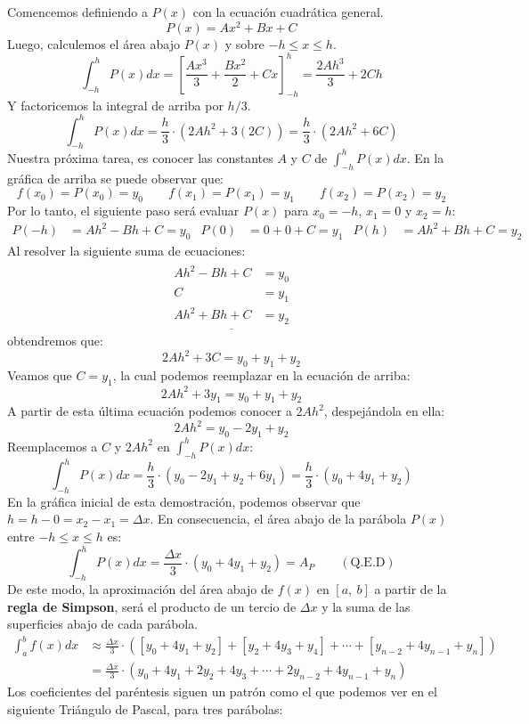 \documentclass[12pt]{article}
\begin{document}
Comencemos definiendo a $P(x)$ con la ecuación cuadrática general.
\[
  P(x) = Ax^{2} + Bx + C
\]
Luego, calculemos el área abajo $P(x)$ y sobre $-h \leq x \leq h$.
\[
  \int_{-h}^{h} P(x)dx = \left[\frac{Ax^{3}}{3} + \frac{Bx^{2}}{2} + Cx\right]_{-h}^{h} = \frac{2Ah^{3}}{3} + 2Ch
\]
Y factoricemos la integral de arriba por $h/3$.
\[
  \int_{-h}^{h} P(x)dx = \frac{h}{3} \cdot \left(2Ah^{2} + 3(2C)\right) = \frac{h}{3} \cdot \left(2Ah^{2} + 6C\right)
\]
Nuestra próxima tarea, es conocer las constantes $A$ y $C$ de $\int_{-h}^{h} P(x)dx$. En la gráfica de arriba se puede observar que:
\[
  f(x_{0}) = P(x_{0}) = y_{0} \qquad f(x_{1}) = P(x_{1}) = y_{1} \qquad f(x_{2}) = P(x_{2}) = y_{2}
\]
Por lo tanto, el siguiente paso será evaluar $P(x)$ para $x_{0} = -h$, $x_{1} = 0$ y $x_{2} = h$:
\begin{align*}
P(-h) &= Ah^{2} - Bh + C = y_{0} & P(0) &= 0 + 0 + C = y_{1} & P(h) &= Ah^{2} + Bh + C = y_{2}
\end{align*}
Al resolver la siguiente suma de ecuaciones:
\[
\begin{aligned}
\underline{
  \begin{aligned}
  Ah^{2} - Bh + C &= y_{0} \\
  C &= y_{1} \\
  Ah^{2} + Bh + C &= y_{2}
  \end{aligned}
}
\end{aligned}
\]
obtendremos que:
\[
  2Ah^{2} + 3C = y_{0} + y_{1} + y_{2}
\]
Veamos que $C = y_{1}$, la cual podemos reemplazar en la ecuación de arriba:
\[
2Ah^{2} + 3y_{1} = y_{0} + y_{1} + y_{2}
\]
A partir de esta última ecuación podemos conocer a $2Ah^{2}$, despejándola en ella:
\[
  2Ah^{2} = y_{0} - 2y_{1} + y_{2}
\]
Reemplacemos a $C$ y $2Ah^{2}$ en $\int_{-h}^{h} P(x)dx$:
\[
  \int_{-h}^{h} P(x)dx = \frac{h}{3} \cdot (y_{0} - 2y_{1} + y_{2} + 6y_{1}) = \frac{h}{3} \cdot (y_{0} + 4y_{1} + y_{2})
\]
En la gráfica inicial de esta demostración, podemos observar que $h = h - 0 = x_{2} - x_{1} = \Delta x$. En consecuencia, el área abajo de la parábola $P(x)$ entre $-h \leq x \leq h$ es:
\[
  \int_{-h}^{h} P(x)dx = \frac{\Delta x}{3} \cdot (y_{0} + 4y_{1} + y_{2}) = A_{P} \qquad (\text{Q.E.D})
\]
De este modo, la aproximación del área abajo de $f(x)$ en $[a, \ b]$ a partir de la \textbf{regla de Simpson}, será el producto de un tercio de $\Delta x$ y la suma de las superficies abajo de cada parábola.
\begin{align*}
  \int_{a}^{b} f(x)dx &\approx \frac{\Delta x}{3} \cdot
                               ([y_{0} + 4y_{1} + y_{2}] + [y_{2} + 4y_{3} + y_{4}] + \cdots + [y_{n - 2} + 4y_{n - 1} + y_{n}]) \\
                      &= \frac{\Delta x}{3} \cdot (y_{0} + 4y_{1} + 2y_{2} + 4y_{3} + \cdots + 2y_{n - 2} + 4y_{n - 1} + y_{n})
\end{align*}
Los coeficientes del paréntesis siguen un patrón como el que podemos ver en el siguiente Triángulo de Pascal, para tres parábolas:
\end{document}
